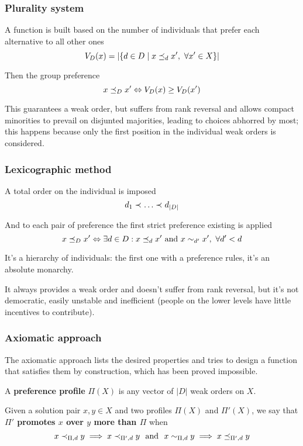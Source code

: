 \subsubsection{Plurality system}

A function is built based on the number of individuals that prefer each alternative to all other ones
$$  V_D (x) = \left|\left\{d \in D \mid x \preceq_{d} x', \ \forall x' \in X\right\}\right|$$

Then the group preference
$$ x \preceq_{D} x' \Leftrightarrow V_D (x) \geq V_D (x') $$

This guarantees a weak order, but suffers from rank reversal and allows compact minorities to prevail on disjunted majorities, leading to choices abhorred by most; this happens because only the first position in the individual weak orders is considered.

\subsubsection{Lexicographic method}

A total order on the individual is imposed
$$ d_1 \pref{} \dots \pref{} d_{|D|} $$

And to each pair of preference the first strict preference existing is applied
$$ x \preceq_{D} x' \Leftrightarrow \exists d \in D : x \preceq_{d} x' \text{ and } x \sim_{d'} x', \ \forall d' < d $$

It's a hierarchy of individuals: the first one with a preference rules, it's an absolute monarchy.

It always provides a weak order and doesn't suffer from rank reversal, but it's not democratic, easily unstable and inefficient (people on the lower levels have little incentives to contribute).

\subsubsection{Axiomatic approach}

The axiomatic approach lists the desired properties and tries to design a function that satisfies them by construction, which has been proved impossible.

A \textbf{preference profile} $\Pi (X)$ is any vector of $|D|$ weak orders on $X$.

Given a solution pair $x, y \in X$ and two profiles $\Pi (X)$ and $\Pi'(X)$, we say that \textbf{$\Pi'$ promotes $x$ over $y$ more than $\Pi$} when
$$ x \prec_{\Pi, d} y \implies x \prec_{\Pi', d} y \ \text{ and } \ x \sim_{\Pi, d} y \implies x \preceq_{\Pi', d} y $$

